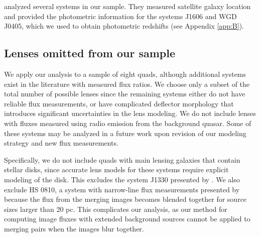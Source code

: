 \citet{Shajib++18} analyzed several systems in our sample. They measured satellite galaxy location and provided the photometric information for the systems J1606 and WGD J0405, which we used to obtain photometric redshifts (see Appendix \ref{app:B}). 

\subsection{Lenses omitted from our sample}

We apply our analysis to a sample of eight quads, although additional systems exist in the literature with measured flux ratios. We choose only a subset of the total number of possible lenses since the remaining systems either do not have reliable flux measurements, or have complicated deflector morphology that introduces significant uncertainties in the lens modeling. We do not include lenses with fluxes measured using radio emission from the background quasar. Some of these systems may be analyzed in a future work upon revision of our modeling strategy and new flux measurements. 

Specifically, we do not include quads with main lensing galaxies that contain stellar disks, since accurate lens models for these systems require explicit modeling of the disk. This excludes the system J1330 presented by \citet{Nierenberg++19}. We also exclude HS 0810, a system with narrow-line flux measurements presented by \citet{Nierenberg++19} because the flux from the merging images becomes blended together for source sizes larger than 20 pc. This complicates our analysis, as our method for computing image fluxes with extended background sources cannot be applied to merging pairs when the images blur together. 

